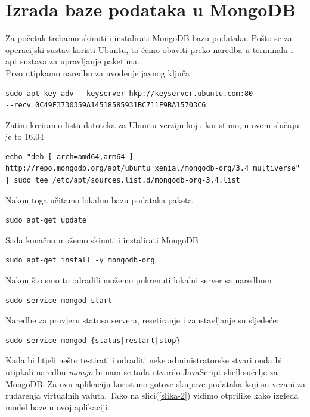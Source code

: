 \documentclass[a4paper,12pt]{foi}
\begin{document}
\chapter{Izrada baze podataka u MongoDB}
Za početak trebamo skinuti i instalirati MongoDB bazu podataka. Pošto se za operacijski sustav koristi Ubuntu, to ćemo obaviti preko naredba u terminalu i apt sustava za upravljanje paketima.\\
Prvo utipkamo naredbu za uvođenje javnog ključa
\lstset{commentstyle=\textit,language=python}
\begin{lstlisting}[frame=tb]
sudo apt-key adv --keyserver hkp://keyserver.ubuntu.com:80
--recv 0C49F3730359A14518585931BC711F9BA15703C6
\end{lstlisting}
Zatim kreiramo listu datoteka za Ubuntu verziju koju koristimo, u ovom slučaju je to 16.04
\lstset{commentstyle=\textit,language=python}
\begin{lstlisting}[frame=tb]
echo "deb [ arch=amd64,arm64 ] 
http://repo.mongodb.org/apt/ubuntu xenial/mongodb-org/3.4 multiverse" 
| sudo tee /etc/apt/sources.list.d/mongodb-org-3.4.list
\end{lstlisting}
Nakon toga učitamo lokalnu bazu podataka paketa
\lstset{commentstyle=\textit,language=python}
\begin{lstlisting}[frame=tb]
sudo apt-get update
\end{lstlisting}
Sada konačno možemo skinuti i instalirati MongoDB
\lstset{commentstyle=\textit,language=python}
\begin{lstlisting}[frame=tb]
sudo apt-get install -y mongodb-org
\end{lstlisting}
Nakon što smo to odradili možemo pokrenuti lokalni server sa naredbom
\lstset{commentstyle=\textit,language=python}
\begin{lstlisting}[frame=tb]
sudo service mongod start
\end{lstlisting}
Naredbe za provjeru statusa servera, resetiranje i zaustavljanje su sljedeće:
\lstset{commentstyle=\textit,language=python}
\begin{lstlisting}[frame=tb]
sudo service mongod {status|restart|stop}
\end{lstlisting}
Kada bi htjeli nešto testirati i odraditi neke administratorske stvari onda bi utipkali naredbu \textit{mongo} bi nam se tada otvorilo JavaScript shell sučelje za MongoDB.
Za ovu aplikaciju koristimo gotove skupove podataka koji su vezani za rudarenja virtualnih valuta. Tako na slici(\ref{slika-2}) vidimo otprilike kako izgleda model baze u ovoj aplikaciji. 
\end{document}
